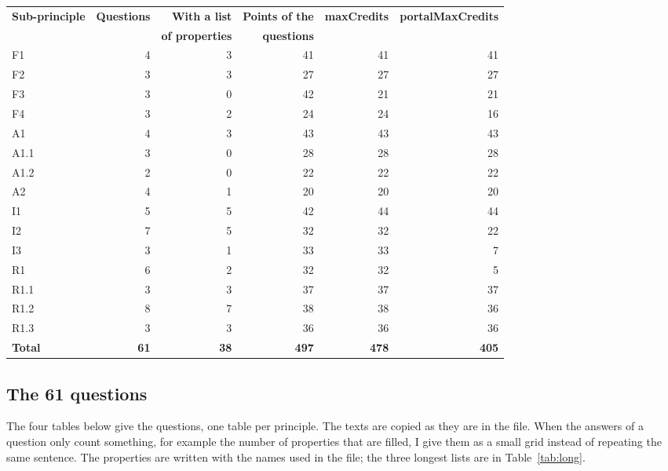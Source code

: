 \documentclass[11pt,a4paper]{article}
\begin{document}
\begin{center}
\small
\renewcommand{\arraystretch}{1.05}
\begin{tabular}{@{}lrrrrr@{}}
\toprule
\textbf{Sub-principle} & \textbf{Questions} & \textbf{With a list} & \textbf{Points of the} & \textbf{maxCredits} & \textbf{portalMaxCredits} \\
 & & \textbf{of properties} & \textbf{questions} & & \\
\midrule
F1 & 4 & 3 & 41 & 41 & 41 \\
F2 & 3 & 3 & 27 & 27 & 27 \\
F3 & 3 & 0 & 42 & 21 & 21 \\
F4 & 3 & 2 & 24 & 24 & 16 \\
\addlinespace[2pt]
A1 & 4 & 3 & 43 & 43 & 43 \\
A1.1 & 3 & 0 & 28 & 28 & 28 \\
A1.2 & 2 & 0 & 22 & 22 & 22 \\
A2 & 4 & 1 & 20 & 20 & 20 \\
\addlinespace[2pt]
I1 & 5 & 5 & 42 & 44 & 44 \\
I2 & 7 & 5 & 32 & 32 & 22 \\
I3 & 3 & 1 & 33 & 33 & 7 \\
\addlinespace[2pt]
R1 & 6 & 2 & 32 & 32 & 5 \\
R1.1 & 3 & 3 & 37 & 37 & 37 \\
R1.2 & 8 & 7 & 38 & 38 & 36 \\
R1.3 & 3 & 3 & 36 & 36 & 36 \\
\midrule
\textbf{Total} & \textbf{61} & \textbf{38} & \textbf{497} & \textbf{478} & \textbf{405} \\
\bottomrule
\end{tabular}
\label{tab:overview}
\end{center}

\subsection{The 61 questions}

The four tables below give the questions, one table per principle. The texts are copied as they
are in the file. When the answers of a question only count something, for example the number of
properties that are filled, I give them as a small grid instead of repeating the same sentence.
The properties are written with the names used in the file; the three longest lists are in
Table~\ref{tab:long}.
\end{document}
